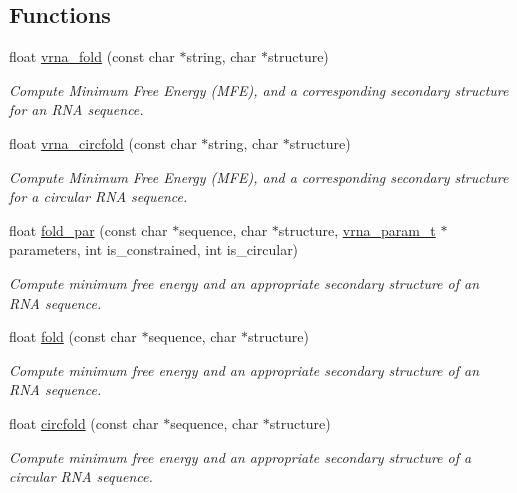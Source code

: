 \subsection*{Functions}
\begin{DoxyCompactItemize}
\item 
float \hyperlink{group__mfe__fold__single_gae7ca49ffb3086f145da36c964a7cec64}{vrna\-\_\-fold} (const char $\ast$string, char $\ast$structure)
\begin{DoxyCompactList}\small\item\em Compute Minimum Free Energy (M\-F\-E), and a corresponding secondary structure for an R\-N\-A sequence. \end{DoxyCompactList}\item 
float \hyperlink{group__mfe__fold__single_gaa0f5bf321038f404b36a6147bdae4154}{vrna\-\_\-circfold} (const char $\ast$string, char $\ast$structure)
\begin{DoxyCompactList}\small\item\em Compute Minimum Free Energy (M\-F\-E), and a corresponding secondary structure for a circular R\-N\-A sequence. \end{DoxyCompactList}\item 
float \hyperlink{group__mfe__fold__single_ga2bc41df5d71fee6fd8da9904ee65d8fb}{fold\-\_\-par} (const char $\ast$sequence, char $\ast$structure, \hyperlink{group__energy__parameters_ga8a69ca7d787e4fd6079914f5343a1f35}{vrna\-\_\-param\-\_\-t} $\ast$parameters, int is\-\_\-constrained, int is\-\_\-circular)
\begin{DoxyCompactList}\small\item\em Compute minimum free energy and an appropriate secondary structure of an R\-N\-A sequence. \end{DoxyCompactList}\item 
float \hyperlink{group__mfe__fold__single_gaadafcb0f140795ae62e5ca027e335a9b}{fold} (const char $\ast$sequence, char $\ast$structure)
\begin{DoxyCompactList}\small\item\em Compute minimum free energy and an appropriate secondary structure of an R\-N\-A sequence. \end{DoxyCompactList}\item 
float \hyperlink{group__mfe__fold__single_ga4ac63ab3e8d9a80ced28b8052d94e423}{circfold} (const char $\ast$sequence, char $\ast$structure)
\begin{DoxyCompactList}\small\item\em Compute minimum free energy and an appropriate secondary structure of a circular R\-N\-A sequence. \end{DoxyCompactList}\item 

\end{DoxyCompactItemize}
